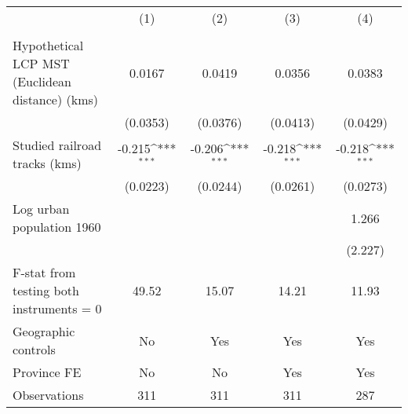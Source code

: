 {
\def\sym#1{\ifmmode^{#1}\else\(^{#1}\)\fi}
\begin{tabular}{l*{4}{c}}
\hline\hline
                &\multicolumn{1}{c}{(1)}&\multicolumn{1}{c}{(2)}&\multicolumn{1}{c}{(3)}&\multicolumn{1}{c}{(4)}\\
                &\multicolumn{1}{c}{}&\multicolumn{1}{c}{}&\multicolumn{1}{c}{}&\multicolumn{1}{c}{}\\
\hline
Hypothetical LCP MST (Euclidean distance) (kms)&   0.0167         &   0.0419         &   0.0356         &   0.0383         \\
                & (0.0353)         & (0.0376)         & (0.0413)         & (0.0429)         \\
[1em]
Studied railroad tracks (kms)&   -0.215\sym{***}&   -0.206\sym{***}&   -0.218\sym{***}&   -0.218\sym{***}\\
                & (0.0223)         & (0.0244)         & (0.0261)         & (0.0273)         \\
[1em]
Log urban population 1960&                  &                  &                  &    1.266         \\
                &                  &                  &                  &  (2.227)         \\
\hline
F-stat from testing both instruments = 0&    49.52         &    15.07         &    14.21         &    11.93         \\
Geographic controls&       No         &      Yes         &      Yes         &      Yes         \\
Province FE     &       No         &       No         &      Yes         &      Yes         \\
Observations    &      311         &      311         &      311         &      287         \\
\hline\hline
\end{tabular}
}
